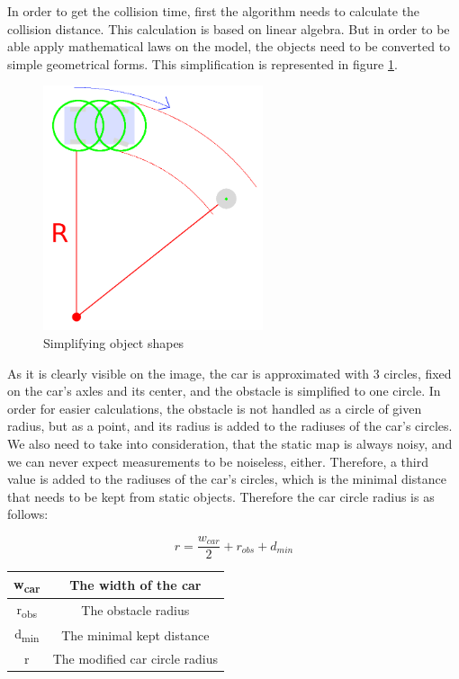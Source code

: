 In order to get the collision time, first the algorithm needs to calculate the collision distance. This calculation is based on linear algebra. But in order to be able apply mathematical laws on the model, the objects need to be converted to simple geometrical forms. This simplification is represented in figure \ref{static_collision_time_check_object_simplification}.

\begin{figure}[!ht]
    \centering
    \includegraphics[height=72mm]{figures/raw/static_collision_time_check_object_simplification.png}
    \caption{Simplifying object shapes}
    \label{static_collision_time_check_object_simplification}
\end{figure}

As it is clearly visible on the image, the car is approximated with 3 circles, fixed on the car's axles and its center, and the obstacle is simplified to one circle. In order for easier calculations, the obstacle is not handled as a circle of given radius, but as a point, and its radius is added to the radiuses of the car's circles. We also need to take into consideration, that the static map is always noisy, and we can never expect measurements to be noiseless, either. Therefore, a third value is added to the radiuses of the car's circles, which is the minimal distance that needs to be kept from static objects. Therefore the car circle radius is as follows:

\[ r = \frac{w_{car}}{2} + r_{obs} + d_{min} \]

\begin{center}
    \begin{tabular}{ | c | c | }
        \hline
        w\textsubscript{car}  	& The width of the car            	\\
        \hline
        r\textsubscript{obs}  	& The obstacle radius         	    \\
        \hline 
        d\textsubscript{min}    & The minimal kept distance      	\\
        \hline 
        r       				& The modified car circle radius    \\
        \hline
    \end{tabular}
\end{center}

